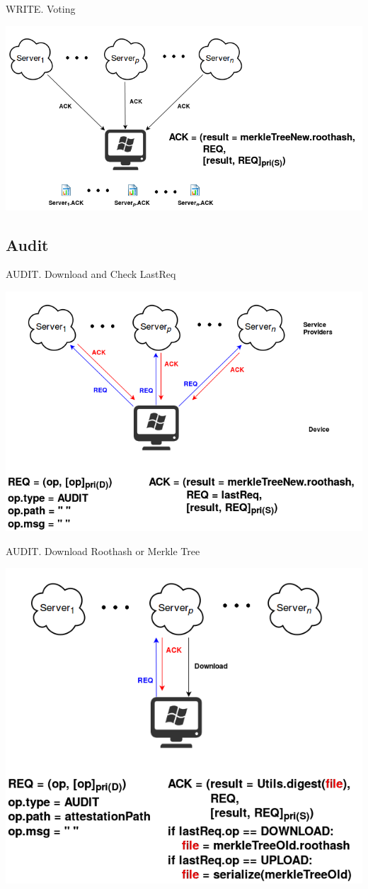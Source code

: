 \documentclass{beamer}
\newcommand{\RNum}[1]{\uppercase\expandafter{\romannumeral #1\relax}}
\begin{document}
\begin{frame}{WRITE}{\RNum{3}. Voting}
	\begin{center}
	\includegraphics[width=.85\textwidth]{Write3.png}
	\end{center}
\end{frame}

\subsection{Audit}
\begin{frame}{AUDIT}{\RNum{1}. Download and Check LastReq}
	\begin{center}
	\includegraphics[width=.85\textwidth]{Audit1.png}
	\end{center}
\end{frame}

\begin{frame}{AUDIT}{\RNum{2}. Download Roothash or Merkle Tree}
	\begin{center}
	\includegraphics[width=.65\textwidth]{Audit2.png}
	\end{center}
\end{frame}
\end{document}
